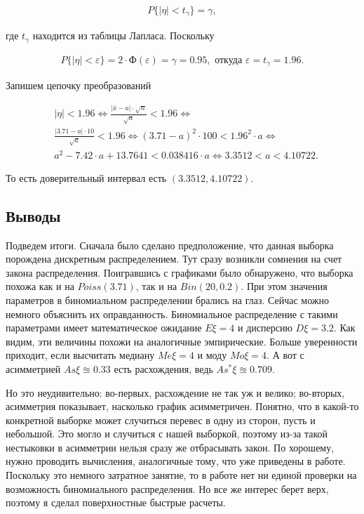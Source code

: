 \documentclass[14pt,a4paper]{scrartcl}
\theoremstyle{definition}
\theoremstyle{remark}
\theoremstyle{definition}
\theoremstyle{definition}
\begin{document}
\begin{align*}
  P\{|\eta| < t_{\gamma}\} = \gamma,
\end{align*}

где $t_{\gamma}$ находится из таблицы Лапласа. Поскольку

\begin{align*}
  P\{|\eta| < \varepsilon\} = 2 \cdot \text{Ф}(\varepsilon) = \gamma = 0.95, \text{ откуда } \varepsilon = t_{\gamma} = 1.96.
\end{align*}

Запишем цепочку преобразований

\begin{align*}
  &|\eta| < 1.96 \iff \frac{|\overline{x}-a|\cdot \sqrt{n}}{\sqrt{a}} < 1.96 \iff \\
  &\frac{|3.71-a|\cdot 10}{\sqrt{a}} < 1.96 \iff (3.71-a)^2 \cdot 100 < 1.96^2 \cdot a \iff \\
  &a^2-7.42\cdot a + 13.7641 < 0.038416\cdot a \iff 3.3512 < a < 4.10722.
\end{align*}

То есть доверительный интервал есть $(3.3512, 4.10722).$

\subsection{Выводы}

Подведем итоги. Сначала было сделано предположение, что данная выборка порождена дискретным распределением. Тут сразу возникли сомнения на счет закона распределения. Поигравшись с графиками было обнаружено, что выборка похожа как и на $Poiss(3.71)$, так и на $Bin(20, 0.2)$. При этом значения параметров в биномиальном распределении брались на глаз. Сейчас можно немного объяснить их оправданность. Биномиальное распределение с такими параметрами имеет математическое ожидание $E\xi = 4$ и дисперсию $D\xi = 3.2$. Как видим, эти величины похожи на аналогичные эмпирические. Больше уверенности приходит, если высчитать медиану $Me\xi = 4$ и моду $Mo\xi = 4$. А вот с асимметрией $As\xi \approxeq 0.33$ есть расхождения, ведь $As^{*}\xi \approxeq 0.709$.

Но это неудивительно: во-первых, расхождение не так уж и велико; во-вторых, асимметрия показывает, насколько график асимметричен. Понятно, что в какой-то конкретной выборке может случиться перевес в одну из сторон, пусть и небольшой. Это могло и случиться с нашей выборкой, поэтому из-за такой нестыковки в асимметрии нельзя сразу же отбрасывать закон. По хорошему, нужно проводить вычисления, аналогичные тому, что уже приведены в работе. Поскольку это немного затратное занятие, то в работе нет ни единой проверки на возможность биномиального распределения. Но все же интерес берет верх, поэтому я сделал поверхностные быстрые расчеты.
\end{document}
